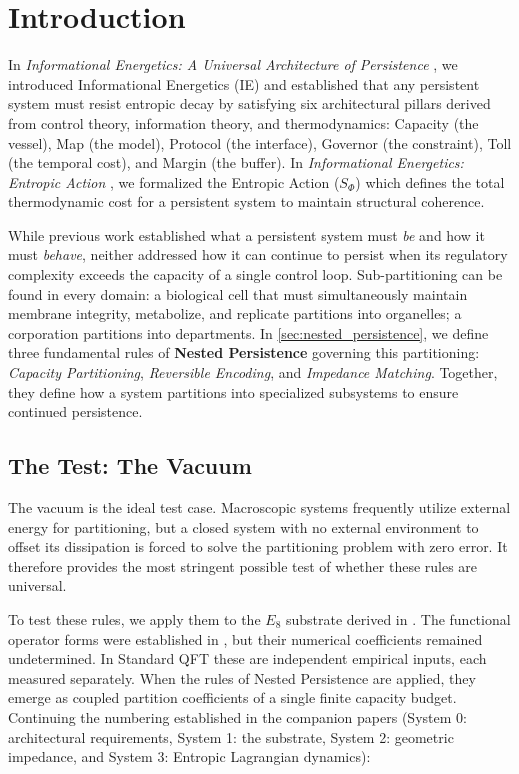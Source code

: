 \section{Introduction}
In \textit{Informational Energetics: A Universal Architecture of Persistence} \cite{meyer_informational_2026}, we introduced Informational Energetics (IE) and established that any persistent system must resist entropic decay by satisfying six architectural pillars derived from control theory, information theory, and thermodynamics: Capacity (the vessel), Map (the model), Protocol (the interface), Governor (the constraint), Toll (the temporal cost), and Margin (the buffer). In \textit{Informational Energetics: Entropic Action} \cite{meyer_ieaction_2026}, we formalized the Entropic Action ($S_\Phi$) which defines the total thermodynamic cost for a persistent system to maintain structural coherence.

While previous work established what a persistent system must \textit{be} and how it must \textit{behave}, neither addressed how it can continue to persist when its regulatory complexity exceeds the capacity of a single control loop. Sub-partitioning can be found in every domain: a biological cell that must simultaneously maintain membrane integrity, metabolize, and replicate partitions into organelles; a corporation partitions into departments. In \cref{sec:nested_persistence}, we define three fundamental rules of \textbf{Nested Persistence} governing this partitioning: \textit{Capacity Partitioning}, \textit{Reversible Encoding}, and \textit{Impedance Matching}. Together, they define how a system partitions into specialized subsystems to ensure continued persistence.

\subsection{The Test: The Vacuum}

The vacuum is the ideal test case. Macroscopic systems frequently utilize external energy for partitioning, but a closed system with no external environment to offset its dissipation is forced to solve the partitioning problem with zero error. It therefore provides the most stringent possible test of whether these rules are universal.

To test these rules, we apply them to the $E_8$ substrate derived in \cite{meyer_informational_2026}. The functional operator forms were established in \cite{meyer_ieaction_2026}, but their numerical coefficients remained undetermined. In Standard QFT these are independent empirical inputs, each measured separately. When the rules of Nested Persistence are applied, they emerge as coupled partition coefficients of a single finite capacity budget. Continuing the numbering established in the companion papers (System 0: architectural requirements, System 1: the substrate, System 2: geometric impedance, and System 3: Entropic Lagrangian dynamics):

